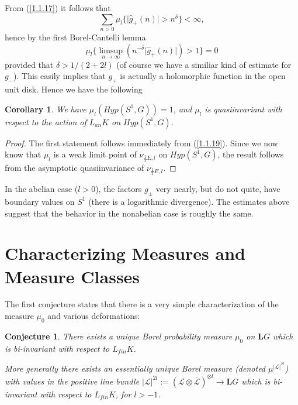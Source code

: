 \documentclass{amsart}
\newtheorem{corollary}{Corollary}
\theoremstyle{conjecture}
\newtheorem{conjecture}{Conjecture}
\theoremstyle{definition}
\theoremstyle{question}
\theoremstyle{questions}
\theoremstyle{remark}
\theoremstyle{remarks}
\theoremstyle{example}
\numberwithin{equation}{section}
\begin{document}
From (\ref{1.1.17}) it follows that
\begin{equation}\sum_{n>0}\mu_l\{\vert\hat {g}_{+}(n)\vert >n^{\delta}\}<\infty
, \label{1.1.18}\end{equation}
hence by the first Borel-Cantelli lemma
\begin{equation}\mu_l\{\limsup_{n\to\infty}(n^{-\delta}\vert\hat {g}_{+}(n)\vert
)>1\}=0 \label{1.1.19}\end{equation}
provided that $\delta >1/(2+2l)$ (of course we have a similiar
kind of estimate for $g_{-}$).  This easily implies that $g_{+}$ is
actually a holomorphic function in the open unit disk.
Hence we have the following

\begin{corollary} We have $\mu_l(Hyp(S^1,G))=1$, and $\mu_
l$
is quasiinvariant with respect to the action of $L_{an}K$ on
$Hyp(S^1,G)$.
\end{corollary}

\begin{proof}  The first statement follows immediately
from (\ref{1.1.19}).  Since we now know that $\mu_l$ is a weak limit
point of $\nu_{\frac 1T E ,l}$ on $Hyp(S^1,G)$, the result follows from the
asymptotic quasiinvariance of $\nu_{\frac 1T E ,l}$.  \end{proof}


In the abelian case ($l>0$), the factors $g_{\pm}$ very nearly,
but do not quite, have boundary values on $S^1$ (there is a logarithmic divergence).  The
estimates above suggest that the behavior in the
nonabelian case is roughly the same.


\section{Characterizing Measures and Measure Classes}\label{uniqueness}

The first conjecture states that there is a very simple characterization of the measure $\mu_0$
and various deformations:

\begin{conjecture}\label{conj1} There exists a unique Borel probability measure $\mu_0$ on $\mathbf L G$
which is bi-invariant with respect to $L_{fin}K$.

More generally there exists an essentially unique Borel measure (denoted $\mu^{|\mathcal L|^{2l}}$)
with values in the positive line bundle $|\mathcal L|^{2l}:=(\mathcal L \otimes \overline{\mathcal L})^{\otimes l} \to \mathbf L G$ which is bi-invariant with respect to $L_{fin}K$, for $l>-1$.

\end{conjecture}
\end{document}
